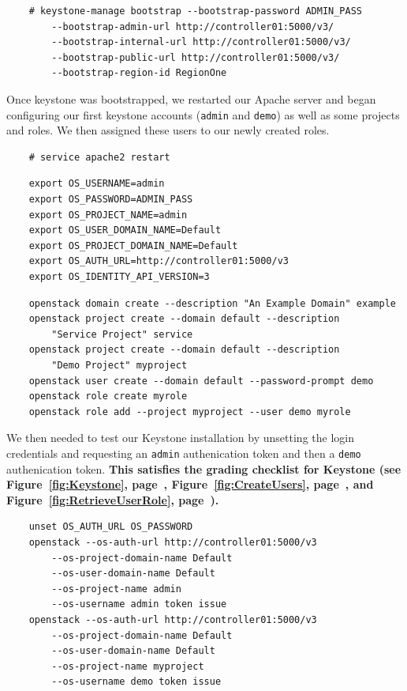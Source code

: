 \documentclass{article}
\begin{document}
\begin{verbatim}
    # keystone-manage bootstrap --bootstrap-password ADMIN_PASS 
        --bootstrap-admin-url http://controller01:5000/v3/ 
        --bootstrap-internal-url http://controller01:5000/v3/ 
        --bootstrap-public-url http://controller01:5000/v3/ 
        --bootstrap-region-id RegionOne
\end{verbatim}

Once keystone was bootstrapped, we restarted our Apache server and began configuring our first keystone accounts (\texttt{admin} and \texttt{demo}) as well as some projects and roles. We then assigned these users to our newly created roles.

\begin{verbatim}
    # service apache2 restart
\end{verbatim}

\begin{verbatim}
    export OS_USERNAME=admin
    export OS_PASSWORD=ADMIN_PASS
    export OS_PROJECT_NAME=admin
    export OS_USER_DOMAIN_NAME=Default
    export OS_PROJECT_DOMAIN_NAME=Default
    export OS_AUTH_URL=http://controller01:5000/v3
    export OS_IDENTITY_API_VERSION=3
\end{verbatim}
\begin{verbatim}
    openstack domain create --description "An Example Domain" example
    openstack project create --domain default --description 
        "Service Project" service
    openstack project create --domain default --description 
        "Demo Project" myproject
    openstack user create --domain default --password-prompt demo
    openstack role create myrole
    openstack role add --project myproject --user demo myrole
\end{verbatim}

We then needed to test our Keystone installation by unsetting the login credentials and requesting an \texttt{admin} authenication token and then a \texttt{demo} authenication token. \textbf{This satisfies the grading checklist for Keystone (see Figure~\ref{fig:Keystone}, page~\pageref{fig:Keystone}, Figure~\ref{fig:CreateUsers}, page~\pageref{fig:CreateUsers}, and Figure~\ref{fig:RetrieveUserRole}, page~\pageref{fig:RetrieveUserRole}).}

\begin{verbatim}
    unset OS_AUTH_URL OS_PASSWORD
    openstack --os-auth-url http://controller01:5000/v3
        --os-project-domain-name Default
        --os-user-domain-name Default 
        --os-project-name admin 
        --os-username admin token issue
    openstack --os-auth-url http://controller01:5000/v3 
        --os-project-domain-name Default
        --os-user-domain-name Default
        --os-project-name myproject
        --os-username demo token issue
\end{verbatim}
\end{document}
